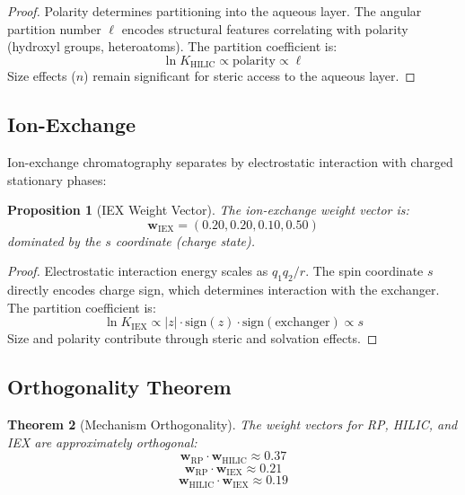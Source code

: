 \documentclass[twocolumn,10pt]{article}
\newtheorem{theorem}{Theorem}[section]
\newtheorem{proposition}[theorem]{Proposition}
\begin{document}
\begin{proof}
Polarity determines partitioning into the aqueous layer. The angular partition number $\ell$ encodes structural features correlating with polarity (hydroxyl groups, heteroatoms). The partition coefficient is:
\begin{equation}
\ln K_{\text{HILIC}} \propto \text{polarity} \propto \ell
\end{equation}
Size effects ($n$) remain significant for steric access to the aqueous layer.
\end{proof}

\subsection{Ion-Exchange}

Ion-exchange chromatography separates by electrostatic interaction with charged stationary phases:

\begin{proposition}[IEX Weight Vector]
\label{prop:iex}
The ion-exchange weight vector is:
\begin{equation}
\mathbf{w}_{\text{IEX}} = (0.20, 0.20, 0.10, 0.50)
\end{equation}
dominated by the $s$ coordinate (charge state).
\end{proposition}

\begin{proof}
Electrostatic interaction energy scales as $q_1 q_2/r$. The spin coordinate $s$ directly encodes charge sign, which determines interaction with the exchanger. The partition coefficient is:
\begin{equation}
\ln K_{\text{IEX}} \propto |z| \cdot \text{sign}(z) \cdot \text{sign}(\text{exchanger}) \propto s
\end{equation}
Size and polarity contribute through steric and solvation effects.
\end{proof}

\subsection{Orthogonality Theorem}

\begin{theorem}[Mechanism Orthogonality]
\label{thm:orthogonal}
The weight vectors for RP, HILIC, and IEX are approximately orthogonal:
\begin{equation}
\mathbf{w}_{\text{RP}} \cdot \mathbf{w}_{\text{HILIC}} \approx 0.37
\end{equation}
\begin{equation}
\mathbf{w}_{\text{RP}} \cdot \mathbf{w}_{\text{IEX}} \approx 0.21
\end{equation}
\begin{equation}
\mathbf{w}_{\text{HILIC}} \cdot \mathbf{w}_{\text{IEX}} \approx 0.19
\end{equation}
\end{theorem}
\end{document}
